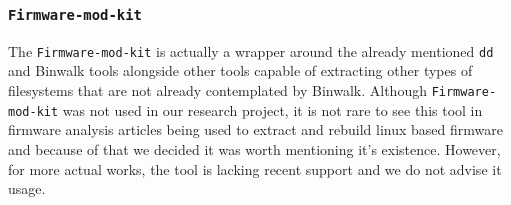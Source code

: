 \subsubsection{ {\tt Firmware-mod-kit} }

The {\tt Firmware-mod-kit} \cite{google-code:firmware-mod-kit} is actually a wrapper around the already mentioned {\tt dd} and Binwalk tools alongside other tools capable of extracting other types of filesystems that are not already contemplated by Binwalk. Although {\tt Firmware-mod-kit} was not used in our research project, it is not rare to see this tool in firmware analysis articles being used to extract and rebuild linux based firmware and because of that we decided it was worth mentioning it's existence. However, for more actual works, the tool is lacking recent support and we do not advise it usage.